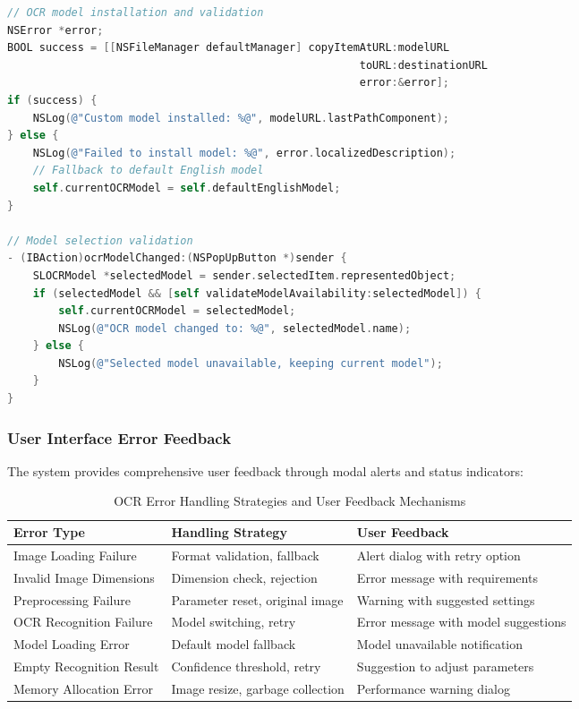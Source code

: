 \begin{lstlisting}[language=C,basicstyle=\footnotesize\ttfamily,frame=single,breaklines=true,columns=flexible,showspaces=false,showstringspaces=false]
// OCR model installation and validation
NSError *error;
BOOL success = [[NSFileManager defaultManager] copyItemAtURL:modelURL 
                                                       toURL:destinationURL 
                                                       error:&error];
if (success) {
    NSLog(@"Custom model installed: %@", modelURL.lastPathComponent);
} else {
    NSLog(@"Failed to install model: %@", error.localizedDescription);
    // Fallback to default English model
    self.currentOCRModel = self.defaultEnglishModel;
}

// Model selection validation
- (IBAction)ocrModelChanged:(NSPopUpButton *)sender {
    SLOCRModel *selectedModel = sender.selectedItem.representedObject;
    if (selectedModel && [self validateModelAvailability:selectedModel]) {
        self.currentOCRModel = selectedModel;
        NSLog(@"OCR model changed to: %@", selectedModel.name);
    } else {
        NSLog(@"Selected model unavailable, keeping current model");
    }
}
\end{lstlisting}

\subsubsection{User Interface Error Feedback}

The system provides comprehensive user feedback through modal alerts and status indicators:

\begin{table}[H]
\centering
\caption{OCR Error Handling Strategies and User Feedback Mechanisms}
\label{tab:ocr_error_handling}
{\begin{tabular}{lll}
\toprule
\textbf{Error Type} & \textbf{Handling Strategy} & \textbf{User Feedback} \\
\midrule
Image Loading Failure & Format validation, fallback & Alert dialog with retry option \\
Invalid Image Dimensions & Dimension check, rejection & Error message with requirements \\
Preprocessing Failure & Parameter reset, original image & Warning with suggested settings \\
OCR Recognition Failure & Model switching, retry & Error message with model suggestions \\
Model Loading Error & Default model fallback & Model unavailable notification \\
Empty Recognition Result & Confidence threshold, retry & Suggestion to adjust parameters \\
Memory Allocation Error & Image resize, garbage collection & Performance warning dialog \\
\bottomrule
\end{tabular}}
\end{table}

